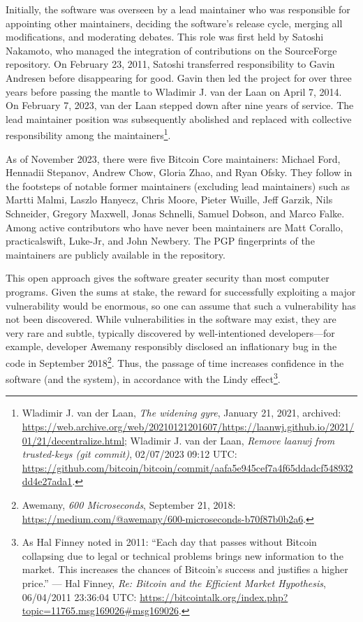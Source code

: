 \documentclass[
  a5paper,
  smalldemyvopaper,10pt,twoside,onecolumn,openright,extrafontsizes,hidelinks]{memoir}
\begin{document}
Initially, the software was overseen by a lead maintainer who was
responsible for appointing other maintainers, deciding the software's
release cycle, merging all modifications, and moderating debates. This
role was first held by Satoshi Nakamoto, who managed the integration of
contributions on the SourceForge repository. On February 23, 2011,
Satoshi transferred responsibility to Gavin Andresen before disappearing
for good. Gavin then led the project for over three years before passing
the mantle to Wladimir J. van der Laan on April 7, 2014. On February 7,
2023, van der Laan stepped down after nine years of service. The lead
maintainer position was subsequently abolished and replaced with
collective responsibility among the maintainers\footnote{Wladimir J. van
  der Laan, \emph{The widening gyre}, January 21, 2021, archived:
  \url{https://web.archive.org/web/20210121201607/https://laanwj.github.io/2021/01/21/decentralize.html};
  Wladimir J. van der Laan, \emph{Remove laanwj from trusted-keys (git
  commit)}, 02/07/2023 09:12 UTC:
  \url{https://github.com/bitcoin/bitcoin/commit/aafa5e945cef7a4f65ddadcf548932dd4e27ada1}.}.

As of November 2023, there were five Bitcoin Core maintainers: Michael
Ford, Hennadii Stepanov, Andrew Chow, Gloria Zhao, and Ryan Ofsky. They
follow in the footsteps of notable former maintainers (excluding lead
maintainers) such as Martti Malmi, Laszlo Hanyecz, Chris Moore, Pieter
Wuille, Jeff Garzik, Nils Schneider, Gregory Maxwell, Jonas Schnelli,
Samuel Dobson, and Marco Falke. Among active contributors who have never
been maintainers are Matt Corallo, practicalswift, Luke-Jr, and John
Newbery. The PGP fingerprints of the maintainers are publicly available
in the repository.

This open approach gives the software greater security than most
computer programs. Given the sums at stake, the reward for successfully
exploiting a major vulnerability would be enormous, so one can assume
that such a vulnerability has not been discovered. While vulnerabilities
in the software may exist, they are very rare and subtle, typically
discovered by well-intentioned developers---for example, developer
Awemany responsibly disclosed an inflationary bug in the code in
September 2018\footnote{Awemany, \emph{600 Microseconds}, September 21,
  2018: \url{https://medium.com/@awemany/600-microseconds-b70f87b0b2a6}.}.
Thus, the passage of time increases confidence in the software (and the
system), in accordance with the Lindy effect\footnote{As Hal Finney
  noted in 2011: ``Each day that passes without Bitcoin collapsing due
  to legal or technical problems brings new information to the market.
  This increases the chances of Bitcoin's success and justifies a higher
  price.'' --- Hal Finney, \emph{Re: Bitcoin and the Efficient Market
  Hypothesis}, 06/04/2011 23:36:04 UTC:
  \url{https://bitcointalk.org/index.php?topic=11765.msg169026\#msg169026}.}.
\end{document}
